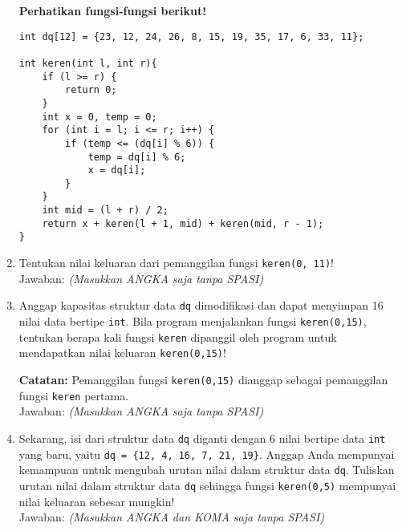 \documentclass[a4paper,11pt]{article}
\begin{document}
\begin{enumerate}
\medskip

\textbf{Perhatikan fungsi-fungsi berikut!}

\begin{verbatim}
int dq[12] = {23, 12, 24, 26, 8, 15, 19, 35, 17, 6, 33, 11};

int keren(int l, int r){
    if (l >= r) {
        return 0;
    }
    int x = 0, temp = 0;
    for (int i = l; i <= r; i++) {
        if (temp <= (dq[i] % 6)) {
            temp = dq[i] % 6;
            x = dq[i];
        }
    }
    int mid = (l + r) / 2;
    return x + keren(l + 1, mid) + keren(mid, r - 1);
}
\end{verbatim}

    \item Tentukan nilai keluaran dari pemanggilan fungsi \texttt{keren(0, 11)}!\\
    Jawaban: \underline{\hspace{4cm}} \textit{{(Masukkan ANGKA saja tanpa SPASI)}}
    
    \item Anggap kapasitas struktur data \texttt{dq} dimodifikasi dan dapat menyimpan 16 nilai data bertipe \texttt{int}. Bila program menjalankan fungsi \texttt{keren(0,15)}, tentukan berapa kali fungsi \texttt{keren} dipanggil oleh program untuk mendapatkan nilai keluaran \texttt{keren(0,15)}!

    \textbf{Catatan:} Pemanggilan fungsi \texttt{keren(0,15)} dianggap sebagai pemanggilan fungsi \texttt{keren} pertama.\\
    Jawaban: \underline{\hspace{4cm}} \textit{{(Masukkan ANGKA saja tanpa SPASI)}}
    
    \item Sekarang, isi dari struktur data \texttt{dq} diganti dengan 6 nilai bertipe data \texttt{int} yang baru, yaitu \texttt{dq = \{12, 4, 16, 7, 21, 19\}}. Anggap Anda mempunyai kemampuan untuk mengubah urutan nilai dalam struktur data \texttt{dq}. Tuliskan urutan nilai dalam struktur data \texttt{dq} sehingga fungsi \texttt{keren(0,5)} mempunyai nilai keluaran sebesar mungkin!\\
    Jawaban: \underline{\hspace{6cm}} \textit{{(Masukkan ANGKA dan KOMA saja tanpa SPASI)}}


\end{enumerate}
\end{document}
